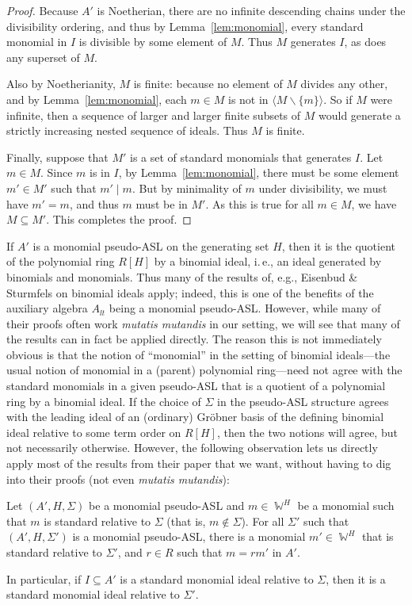 \documentclass[11pt,reqno]{amsart}
\DeclareMathOperator{\W}{\mathbb{W}}
\newcommand{\divides}{\mid}
\theoremstyle{definition}
\numberwithin{equation}{section}
\begin{document}
\begin{proof}
Because $A'$ is Noetherian, there are no infinite descending chains under the divisibility ordering, and thus by Lemma~\ref{lem:monomial}, every standard monomial in $I$ is divisible by some element of $M$. Thus $M$ generates $I$, as does any superset of $M$.

Also by Noetherianity, $M$ is finite: because no element of $M$ divides any other, and by Lemma~\ref{lem:monomial}, each $m \in M$ is not in $\langle M \backslash \{m\} \rangle$. So if $M$ were infinite, then a sequence of larger and larger finite subsets of $M$ would generate a strictly increasing nested sequence of ideals. Thus $M$ is finite.

Finally, suppose that $M'$ is a set of standard monomials that generates $I$. Let $m \in M$. Since $m$ is in $I$, by Lemma~\ref{lem:monomial}, there must be some element $m' \in M'$ such that $m' \divides m$. But by minimality of $m$ under divisibility, we must have $m' = m$, and thus $m$ must be in $M'$. As this is true for all $m \in M$, we have $M \subseteq M'$. This completes the proof.
\end{proof}

If $A'$ is a monomial pseudo-ASL on the generating set $H$, then it is the quotient of the polynomial ring $R[H]$ by a binomial ideal, i.\,e., an ideal generated by binomials and monomials. Thus many of the results of, e.g., Eisenbud \& Sturmfels \cite{ES} on binomial ideals apply; indeed, this is one of the benefits of the auxiliary algebra $A_{lt}$ being a monomial pseudo-ASL. However, while many of their proofs often work \emph{mutatis mutandis} in our setting, we will see that many of the results can in fact be applied directly. The reason this is not immediately obvious is that the notion of ``monomial'' in the setting of binomial ideals---the usual notion of monomial in a (parent) polynomial ring---need not agree with the standard monomials in a given pseudo-ASL that is a quotient of a polynomial ring by a binomial ideal. If the choice of $\Sigma$ in the pseudo-ASL structure agrees with the leading ideal of an (ordinary) Gröbner basis of the defining binomial ideal relative to some term order on $R[H]$, then the two notions will agree, but not necessarily otherwise. However, the following observation lets us directly apply most of the results from their paper that we want, without having to dig into their proofs (not even \emph{mutatis mutandis}):

\begin{observation} \label{lem:standard-all-sigma}
Let $(A',H,\Sigma)$ be a monomial pseudo-ASL
and $m \in \W^H$ be a monomial such that $m$ is standard relative to $\Sigma$ (that is, $m \notin \Sigma$). For all $\Sigma'$ such that $(A', H, \Sigma')$ is a monomial pseudo-ASL,
there is a monomial $m' \in \W^H$ that is standard relative to $\Sigma'$, and $r \in R$ such that $m=rm'$ in $A'$.

In particular, if $I \subseteq A'$ is a standard monomial ideal relative to $\Sigma$, then it is a standard monomial ideal relative to $\Sigma'$.
\end{observation}
\end{document}
